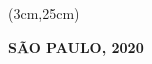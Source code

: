 \begin{titlepage}
\begin{textblock*}{15cm}
\begin{LARGE}
        \end{LARGE}
        
    \end{textblock*}
    
    \begin{textblock*}{15cm}(3cm,25cm)
        \makeatletter
        \begin{center}
            {\color{black}
                \textbf{SÃO PAULO, 2020} 
            }
        \end{center}
        \makeatother
    \end{textblock*}

\end{titlepage}

